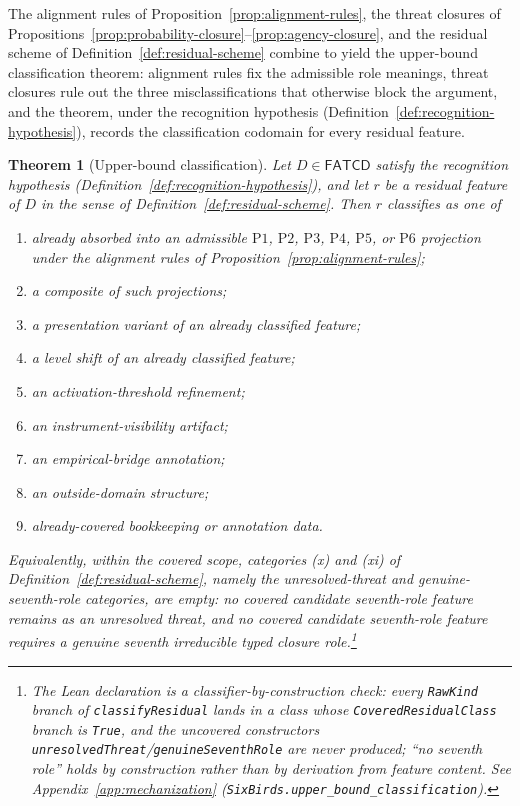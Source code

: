 \documentclass[11pt]{article}
\newtheorem{theorem}{Theorem}[section]
\theoremstyle{definition}
\newcommand{\FATCD}{\ensuremath{\mathsf{FATCD}}}
\newcommand{\Pone}{\ensuremath{\mathrm{P1}}}
\newcommand{\Ptwo}{\ensuremath{\mathrm{P2}}}
\newcommand{\Pthree}{\ensuremath{\mathrm{P3}}}
\newcommand{\Pfour}{\ensuremath{\mathrm{P4}}}
\newcommand{\Pfive}{\ensuremath{\mathrm{P5}}}
\newcommand{\Psix}{\ensuremath{\mathrm{P6}}}
\begin{document}
The alignment rules of Proposition~\ref{prop:alignment-rules}, the
threat closures of
Propositions~\ref{prop:probability-closure}--\ref{prop:agency-closure},
and the residual scheme of Definition~\ref{def:residual-scheme}
combine to yield the upper-bound classification theorem: alignment
rules fix the admissible role meanings, threat closures rule out the
three misclassifications that otherwise block the argument, and the
theorem, under the recognition hypothesis
(Definition~\ref{def:recognition-hypothesis}), records the classification
codomain for every residual feature.

\begin{theorem}[Upper-bound classification]\label{thm:upper-bound-classification}
Let \(D \in \FATCD{}\) satisfy the recognition hypothesis
(Definition~\ref{def:recognition-hypothesis}), and let \(r\) be a residual
feature of \(D\) in the sense of Definition~\ref{def:residual-scheme}. Then
\(r\) classifies as one of
\begin{enumerate}[label=(\roman*),topsep=2pt,itemsep=1pt]
  \item already absorbed into an admissible \Pone{}, \Ptwo{}, \Pthree{},
    \Pfour{}, \Pfive{}, or \Psix{} projection under the alignment rules of
    Proposition~\ref{prop:alignment-rules};
  \item a composite of such projections;
  \item a presentation variant of an already classified feature;
  \item a level shift of an already classified feature;
  \item an activation-threshold refinement;
  \item an instrument-visibility artifact;
  \item an empirical-bridge annotation;
  \item an outside-domain structure;
  \item already-covered bookkeeping or annotation data.
\end{enumerate}
Equivalently, within the covered scope, categories (x) and (xi) of
Definition~\ref{def:residual-scheme}, namely the unresolved-threat and
genuine-seventh-role categories, are empty: no covered candidate
seventh-role feature remains as an unresolved threat, and no covered
candidate seventh-role feature requires a genuine seventh irreducible
typed closure role.\footnote{The Lean declaration is a classifier-by-construction check: every \texttt{RawKind} branch of \texttt{classifyResidual} lands in a class whose \texttt{CoveredResidualClass} branch is \texttt{True}, and the uncovered constructors \texttt{unresolvedThreat}/\texttt{genuineSeventhRole} are never produced; ``no seventh role'' holds by construction rather than by derivation from feature content. See Appendix~\ref{app:mechanization} (\texttt{SixBirds.upper\_bound\_classification}).}
\end{theorem}
\end{document}
